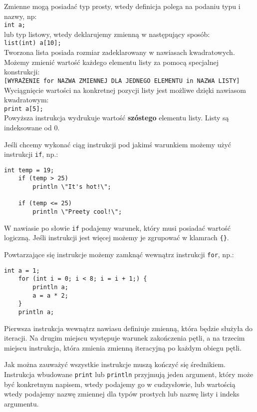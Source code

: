 \documentclass{article}
\begin{document}
Zmienne mogą posiadać typ prosty, wtedy definicja polega na podaniu typu i nazwy, np: \\
\texttt{int a;} \\
lub typ listowy, wtedy deklarujemy zmienną w następujący sposób:\\
\texttt{list(int) a[10];} \\
Tworzona lista posiada rozmiar zadeklarowany w nawiasach kwadratowych.\\

Możemy zmienić wartość każdego elementu listy za pomocą specjalnej konstrukcji:\\
\texttt{[WYRAŻENIE for NAZWA ZMIENNEJ DLA JEDNEGO ELEMENTU in NAZWA LISTY]} \\

Wyciągnięcie wartości na konkretnej pozycji listy jest możliwe dzięki nawiasom kwadratowym:\\
\texttt{print a[5];} \\
Powyższa instrukcja wydrukuje wartość \textbf{szóstego} elementu listy. Listy są indeksowane od 0.

Jeśli chcemy wykonać ciąg instrukcji pod jakimś warunkiem możemy użyć instrukcji \texttt{if}, np.:
\begin{lstlisting}[tabsize=2]
	int temp = 19;
	if (temp > 25)
		println \"It's hot!\";

	if (temp <= 25)
		println \"Preety cool!\";
\end{lstlisting}
W nawiasie po słowie \texttt{if} podajemy warunek, który musi posiadać wartość logiczną. Jeśli instrukcji jest więcej możemy je zgrupować w klamrach \texttt{\{\}}.

Powtarzające się instrukcje możemy zamknąć wewnątrz instrukcji \texttt{for}, np.:
\begin{lstlisting}[tabsize=2]
	int a = 1;
	for (int i = 0; i < 8; i = i + 1;) {
		println a;
		a = a * 2;
	}
	println a;
\end{lstlisting}
Pierwsza instrukcja wewnątrz nawiasu definiuje zmienną, która będzie służyła do iteracji. Na drugim miejscu występuje warunek zakończenia pętli, a na trzecim miejscu instrukcja, która zmienia zmienną iteracyjną po każdym obiegu pętli.

Jak można zauważyć wszystkie instrukcje muszą kończyć się średnikiem.
Instrukcja wbudowane \texttt{print} lub \texttt{println} przyjmują jeden argument, który może być konkretnym napisem, wtedy podajemy go w cudzysłowie, lub wartością wtedy podajemy nazwę zmiennej dla typów prostych lub nazwę listy i indeks argumentu.
\end{document}

